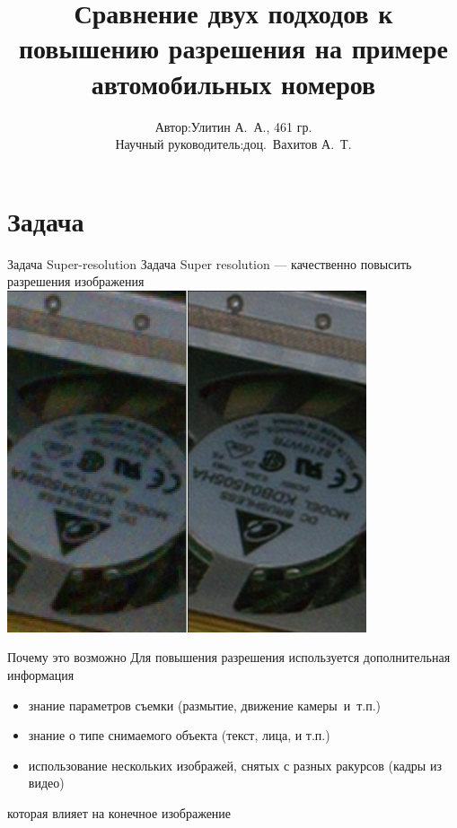 \title{ Сравнение двух подходов к повышению разрешения на примере автомобильных номеров }
\author{
  \begin{tabular}[4cm]{rl}
 Автор:                & Улитин А.~А., 461 гр. \\
 Научный руководитель: & доц.~Вахитов А.~Т.
 \end{tabular}
 }
\date{}

\begin{frame}{}
		\maketitle
\end{frame}

\section{Задача}
\begin{frame}{Задача Super-resolution}
  Задача Super resolution --- качественно повысить разрешения изображения
  \includegraphics[height=\textheight]{content/An_example_of_super_resolution_with_still_RAW_photo.jpg}
\end{frame}

\begin{frame}{Почему это возможно}
  Для повышения разрешения используется дополнительная информация
  \begin{itemize}
    \item знание параметров съемки (размытие, движение камеры~и~т.п.)
    \item знание о типе снимаемого объекта (текст, лица, и т.п.)
    \item использование нескольких изображей, снятых с разных ракурсов
      (кадры из видео)
  \end{itemize}
  которая влияет на конечное изображение
\end{frame}

